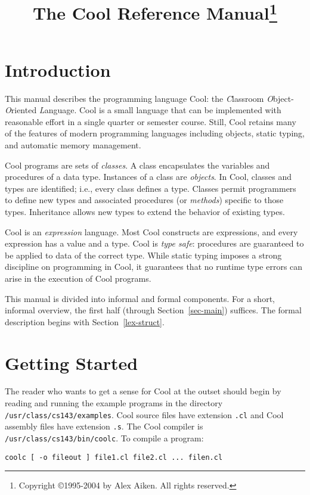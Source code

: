 \documentclass[11pt]{article}
\begin{document}
\title{The Cool Reference Manual\thanks{
Copyright \copyright 1995-2004 by Alex Aiken.
All rights reserved.}}  

\author{ }
\date{ }
\maketitle


\tableofcontents \newpage


\section{Introduction}

This manual describes the programming language Cool: the {\em C}lassroom
{\em O}bject-{\em O}riented {\em L}anguage.
Cool is a small language that can be
implemented with reasonable effort in a single quarter or semester course.  Still, Cool
retains many of the features of modern programming languages including
objects, static typing, and automatic memory management.

Cool programs are sets of {\em classes}.  A class encapsulates the variables
and procedures of a data type.  Instances of a class are
{\em objects}.  In Cool, classes and types are identified; i.e., every
class defines a type.  Classes permit programmers to define new
types and associated procedures (or {\em methods}) specific to those
types.  Inheritance allows new types to extend the behavior of
existing types.

Cool is an {\em expression} language.  Most Cool constructs are
expressions, and every expression has a value and a type.  Cool is
{\em type safe}: procedures are guaranteed to be applied to data of
the correct type.  While static typing imposes a strong discipline on
programming in Cool, it guarantees that no runtime type errors can
arise in the execution of Cool programs.

This manual is divided into informal and formal components.  For a short,
informal overview, the first half (through Section~\ref{sec-main}) suffices.
The formal description begins with Section~\ref{lex-struct}.

\section{Getting Started}
\label{sec-start}

The reader who wants to get a sense for Cool at the outset should
begin by reading and running the example programs in the directory
{\tt /usr/class/cs143/examples}.  Cool source files have extension {\tt .cl}
and Cool assembly files have extension {\tt .s}.
The Cool compiler is {\tt /usr/class/cs143/bin/coolc}.  To compile a program:
\begin{verbatim}
coolc [ -o fileout ] file1.cl file2.cl ... filen.cl 
\end{verbatim}
\end{document}
